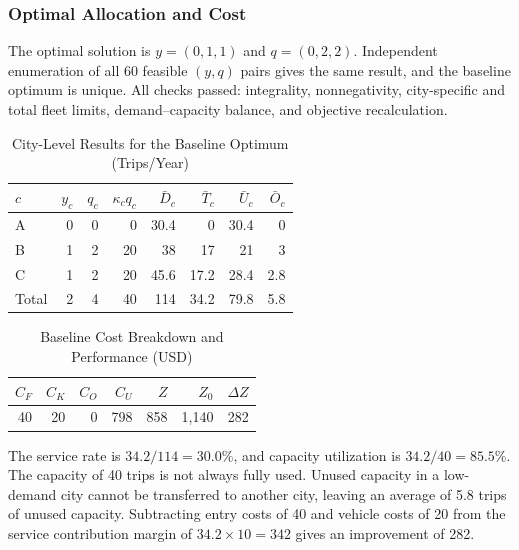 \documentclass[10pt,a4paper]{article}
\begin{document}
\subsubsection{Optimal Allocation and Cost}
The optimal solution is $y=(0,1,1)$ and $q=(0,2,2)$. Independent enumeration of all 60 feasible $(y,q)$ pairs gives the same result, and the baseline optimum is unique. All checks passed: integrality, nonnegativity, city-specific and total fleet limits, demand--capacity balance, and objective recalculation.
\begin{table}[H]
\centering\small
\caption{City-Level Results for the Baseline Optimum (Trips/Year)}\label{tab:sc-base-city}
\begin{tabular}{lrrrrrrr}
\toprule
$c$ & $y_c$ & $q_c$ & $\kappa_cq_c$ & $\bar D_c$ & $\bar T_c$ & $\bar U_c$ & $\bar O_c$\\\midrule
A & 0 & 0 & 0 & 30.4 & 0 & 30.4 & 0\\
B & 1 & 2 & 20 & 38 & 17 & 21 & 3\\
C & 1 & 2 & 20 & 45.6 & 17.2 & 28.4 & 2.8\\
Total & 2 & 4 & 40 & 114 & 34.2 & 79.8 & 5.8\\
\bottomrule
\end{tabular}
\end{table}
\begin{table}[H]
\centering\small
\caption{Baseline Cost Breakdown and Performance (USD)}\label{tab:sc-base-cost}
\begin{tabular}{rrrrrrr}
\toprule
$C_F$ & $C_K$ & $C_O$ & $C_U$ & $Z$ & $Z_0$ & $\Delta Z$\\\midrule
40 & 20 & 0 & 798 & 858 & 1,140 & 282\\
\bottomrule
\end{tabular}
\end{table}
The service rate is $34.2/114=30.0\%$, and capacity utilization is $34.2/40=85.5\%$. The capacity of 40 trips is not always fully used. Unused capacity in a low-demand city cannot be transferred to another city, leaving an average of 5.8 trips of unused capacity. Subtracting entry costs of 40 and vehicle costs of 20 from the service contribution margin of $34.2\times10=342$ gives an improvement of 282.
\end{document}
